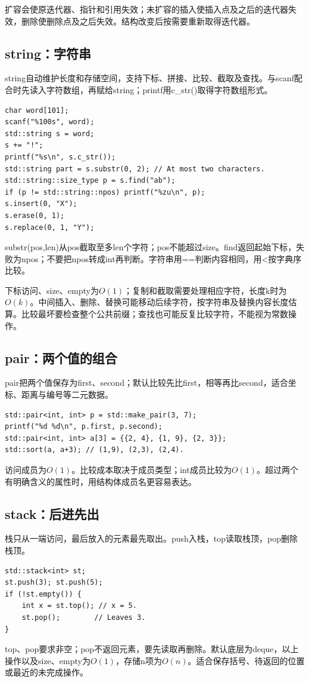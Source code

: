 扩容会使原迭代器、指针和引用失效；未扩容的插入使插入点及之后的迭代器失效，删除使删除点及之后失效。结构改变后按需要重新取得迭代器。

\subsection{string：字符串}
string自动维护长度和存储空间，支持下标、拼接、比较、截取及查找。与scanf配合时先读入字符数组，再赋给string；printf用c\_str()取得字符数组形式。
\begin{lstlisting}
char word[101];
scanf("%100s", word);
std::string s = word;
s += "!";
printf("%s\n", s.c_str());
std::string part = s.substr(0, 2); // At most two characters.
std::string::size_type p = s.find("ab");
if (p != std::string::npos) printf("%zu\n", p);
s.insert(0, "X");
s.erase(0, 1);
s.replace(0, 1, "Y");
\end{lstlisting}
substr(pos,len)从pos截取至多len个字符；pos不能超过size。find返回起始下标，失败为npos；不要把npos转成int再判断。字符串用==判断内容相同，用<按字典序比较。

下标访问、size、empty为$O(1)$；复制和截取需要处理相应字符，长度k时为$O(k)$。中间插入、删除、替换可能移动后续字符，按字符串及替换内容长度估算。比较最坏要检查整个公共前缀；查找也可能反复比较字符，不能视为常数操作。

\subsection{pair：两个值的组合}
pair把两个值保存为first、second；默认比较先比first，相等再比second，适合坐标、距离与编号等二元数据。
\begin{lstlisting}
std::pair<int, int> p = std::make_pair(3, 7);
printf("%d %d\n", p.first, p.second);
std::pair<int, int> a[3] = {{2, 4}, {1, 9}, {2, 3}};
std::sort(a, a+3); // (1,9), (2,3), (2,4).
\end{lstlisting}
访问成员为$O(1)$。比较成本取决于成员类型；int成员比较为$O(1)$。超过两个有明确含义的属性时，用结构体成员名更容易表达。

\subsection{stack：后进先出}
栈只从一端访问，最后放入的元素最先取出。push入栈，top读取栈顶，pop删除栈顶。
\begin{lstlisting}
std::stack<int> st;
st.push(3); st.push(5);
if (!st.empty()) {
    int x = st.top(); // x = 5.
    st.pop();        // Leaves 3.
}
\end{lstlisting}
top、pop要求非空；pop不返回元素，要先读取再删除。默认底层为deque，以上操作以及size、empty为$O(1)$，存储n项为$O(n)$。适合保存括号、待返回的位置或最近的未完成操作。

